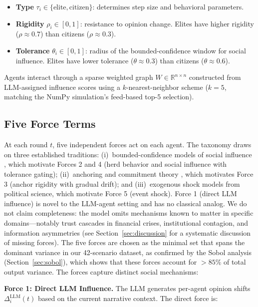 \documentclass[12pt]{article}
\begin{document}
\begin{itemize}
    \item \textbf{Type} $\tau_i \in \{\text{elite}, \text{citizen}\}$: determines step size and behavioral parameters.
    \item \textbf{Rigidity} $\rho_i \in [0, 1]$: resistance to opinion change. Elites have higher rigidity ($\rho \approx 0.7$) than citizens ($\rho \approx 0.3$).
    \item \textbf{Tolerance} $\theta_i \in [0, 1]$: radius of the bounded-confidence window for social influence. Elites have lower tolerance ($\theta \approx 0.3$) than citizens ($\theta \approx 0.6$).
\end{itemize}

Agents interact through a sparse weighted graph $W \in \mathbb{R}^{n \times n}$ constructed from LLM-assigned influence scores using a $k$-nearest-neighbor scheme ($k = 5$, matching the NumPy simulation's feed-based top-5 selection).

\subsection{Five Force Terms}

At each round $t$, five independent forces act on each agent. The taxonomy draws on three established traditions: (i)~bounded-confidence models of social influence \citep{deffuant2000,hegselmann2002}, which motivate Forces 2 and 4 (herd behavior and social influence with tolerance gating); (ii)~anchoring and commitment theory \citep{festinger1957}, which motivates Force 3 (anchor rigidity with gradual drift); and (iii)~exogenous shock models from political science, which motivate Force 5 (event shock). Force 1 (direct LLM influence) is novel to the LLM-agent setting and has no classical analog. We do not claim completeness: the model omits mechanisms known to matter in specific domains---notably trust cascades in financial crises, institutional contagion, and information asymmetries (see Section~\ref{sec:discussion} for a systematic discussion of missing forces). The five forces are chosen as the minimal set that spans the dominant variance in our 42-scenario dataset, as confirmed by the Sobol analysis (Section~\ref{sec:sobol}), which shows that these forces account for $>85\%$ of total output variance. The forces capture distinct social mechanisms:

\textbf{Force 1: Direct LLM Influence.} The LLM generates per-agent opinion shifts $\Delta_i^{\text{LLM}}(t)$ based on the current narrative context. The direct force is:
\end{document}
